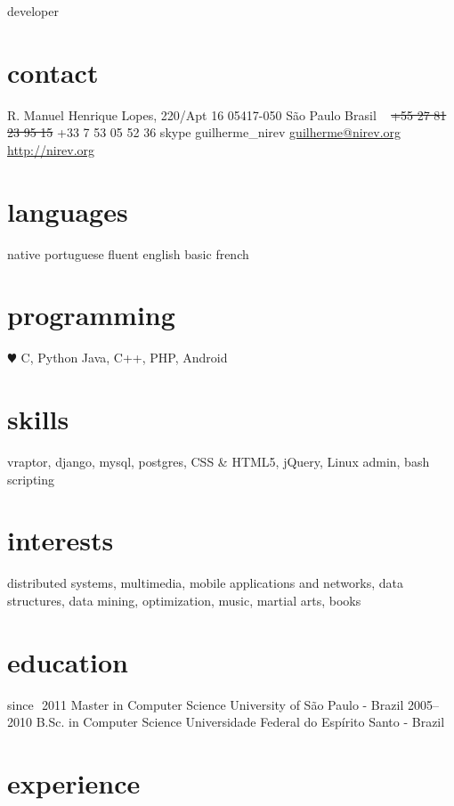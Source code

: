 \documentclass{friggeri-cv}
\begin{document}
       {developer}


\begin{aside}
  \section{contact}
    R. Manuel Henrique Lopes, 220/Apt 16
    05417-050 São Paulo
    Brasil
    ~
    \sout{+55 27 81 23 95 15}
    +33 \phantom{0}7 53 05 52 36
    {\footnotesize skype} guilherme\_nirev
    \href{mailto:guilherme@nirev.org}{guilherme@nirev.org}
    \href{http://nirev.org}{http://nirev.org}
  \section{languages}
    native portuguese
    fluent english
    basic french
  \section{programming}
    {\color{red} $\varheartsuit$} C, Python
    Java, C++, PHP, Android
  \section{skills}
    vraptor, django,
    mysql, postgres,
    CSS \& HTML5,
    jQuery, Linux admin,
    bash scripting
  \section{interests}
distributed systems, multimedia, mobile applications and networks, data structures, data mining, optimization, music, martial arts,
books
\end{aside}


\section{education}

\begin{entrylist}

\entry
  {since $\,\,$2011}
  {Master in Computer Science}
  {University of São Paulo - Brazil}{}
\entry
  {2005–2010}
  {B.Sc. in Computer Science}
  {Universidade Federal do Espírito Santo - Brazil}{}
\end{entrylist}

\section{experience}
\end{document}
